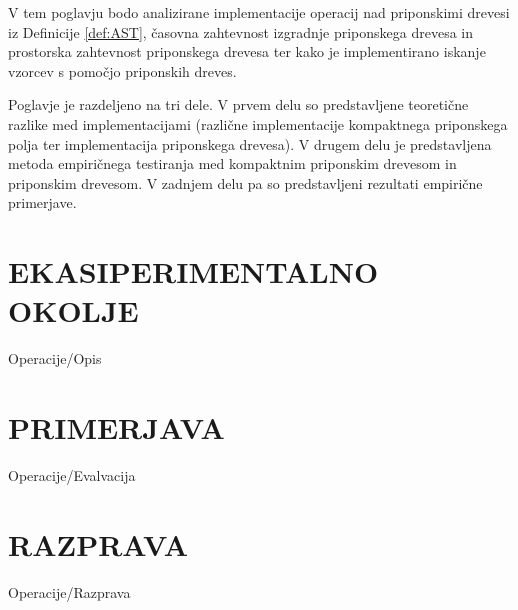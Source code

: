 V tem poglavju bodo analizirane implementacije operacij nad priponskimi drevesi iz Definicije \ref{def:AST}, časovna zahtevnost izgradnje priponskega drevesa in prostorska zahtevnost priponskega drevesa ter kako je implementirano iskanje vzorcev s pomočjo priponskih dreves.

Poglavje je razdeljeno na tri dele. V prvem delu so predstavljene teoretične razlike med implementacijami (različne implementacije kompaktnega priponskega polja ter implementacija priponskega drevesa). V drugem delu je predstavljena metoda empiričnega testiranja med kompaktnim priponskim drevesom in priponskim drevesom. V zadnjem delu pa so predstavljeni rezultati empirične primerjave.



\section{EKASIPERIMENTALNO OKOLJE}\label{sec:opis}
{Operacije/Opis}


\section{PRIMERJAVA}\label{sec:primerjava}
{Operacije/Evalvacija}

\section{RAZPRAVA}\label{sec:razprava}
{Operacije/Razprava}